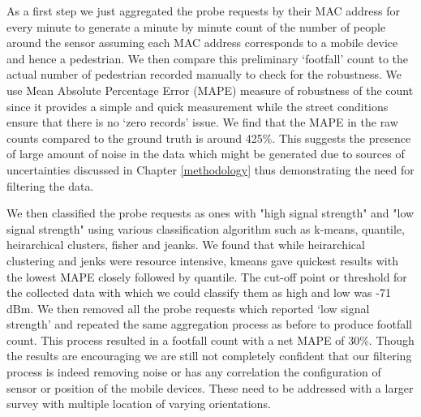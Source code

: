 As a first step we just aggregated the probe requests by their MAC address for every minute to generate a minute by minute count of the number of people around the sensor assuming each MAC address corresponds to a mobile device and hence a pedestrian.
We then compare this preliminary `footfall' count to the actual number of pedestrian recorded manually to check for the robustness. We use Mean Absolute Percentage Error (MAPE) measure of robustness of the count since it provides a simple and quick measurement while the street conditions ensure that there is no `zero records' issue.
We find that the MAPE in the raw counts compared to the ground truth is around 425\%.
This suggests the presence of large amount of noise in the data which might be generated due to sources of uncertainties discussed in Chapter \ref{methodology} thus demonstrating the need for filtering the data.

We then classified the probe requests as ones with "high signal strength" and "low signal strength" using various classification algorithm such as k-means, quantile, heirarchical clusters, fisher and jeanks.
We found that while heirarchical clustering and jenks were resource intensive, kmeans gave quickest results with the lowest MAPE closely followed by quantile.
The cut-off point or threshold for the collected data with which we could classify them as high and low was -71 dBm.
We then removed all the probe requests which reported `low signal strength' and repeated the same aggregation process as before to produce footfall count. 
This process resulted in a footfall count with a net MAPE of 30\%.
Though the results are encouraging we are still not completely confident that our filtering process is indeed removing noise or has any correlation the configuration of sensor or position of the mobile devices.
These need to be addressed with a larger survey with multiple location of varying orientations.

